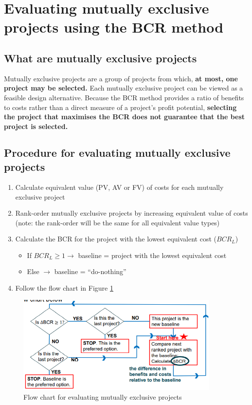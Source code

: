 \section{Evaluating mutually exclusive projects using the BCR method}
\subsection{What are mutually exclusive projects}
Mutually exclusive projects are a group of projects from which, \textbf{at most, one project may be selected.} Each mutually exclusive project can be viewed as a feasible design alternative. Because the BCR method provides a ratio of benefits to costs rather than a direct measure of a project's profit potential, \textbf{selecting the project that maximises the BCR does not guarantee that the best project is selected.}
\subsection{Procedure for evaluating mutually exclusive projects}
\begin{enumerate}
  \item Calculate equivalent value (PV, AV or FV) of costs for each mutually exclusive project
  \item Rank-order mutually exclusive projects by increasing equivalent value of costs (note: the rank-order will be the same for all equivalent value types)
  \item Calculate the BCR for the project with the lowest equivalent cost ($BCR_L$)
        \begin{itemize}
          \item If $BCR_L \geq 1 \rightarrow$ baseline = project with the lowest equivalent cost
          \item Else $\rightarrow$ baseline = ``do-nothing''
        \end{itemize}
  \item Follow the flow chart in Figure \ref{fig:EMEFC}
\end{enumerate}
\begin{figure}[H]
  \centering
  \includegraphics[width = 0.9\textwidth]{./img/figure25.png}
  \caption{Flow chart for evaluating mutually exclusive projects}
  \label{fig:EMEFC}
\end{figure}
